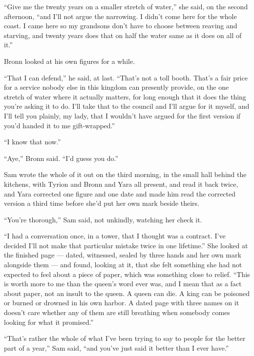“Give me the twenty years on a smaller stretch of water,” she said, on the second afternoon, “and I’ll not argue the narrowing. I didn’t come here for the whole coast. I came here so my grandsons don’t have to choose between reaving and starving, and twenty years does that on half the water same as it does on all of it.”

Bronn looked at his own figures for a while.

“That I can defend,” he said, at last. “That’s not a toll booth. That’s a fair price for a service nobody else in this kingdom can presently provide, on the one stretch of water where it actually matters, for long enough that it does the thing you’re asking it to do. I’ll take that to the council and I’ll argue for it myself, and I’ll tell you plainly, my lady, that I wouldn’t have argued for the first version if you’d handed it to me gift-wrapped.”

“I know that now.”

“Aye,” Bronn said. “I’d guess you do.”

\sceneBreak

Sam wrote the whole of it out on the third morning, in the small hall behind the kitchens, with Tyrion and Bronn and Yara all present, and read it back twice, and Yara corrected one figure and one date and made him read the corrected version a third time before she’d put her own mark beside theirs.

“You’re thorough,” Sam said, not unkindly, watching her check it.

“I had a conversation once, in a tower, that I thought was a contract. I’ve decided I’ll not make that particular mistake twice in one lifetime.” She looked at the finished page — dated, witnessed, sealed by three hands and her own mark alongside them — and found, looking at it, that she felt something she had not expected to feel about a piece of paper, which was something close to relief. “This is worth more to me than the queen’s word ever was, and I mean that as a fact about paper, not an insult to the queen. A queen can die. A king can be poisoned or burned or drowned in his own harbor. A dated page with three names on it doesn’t care whether any of them are still breathing when somebody comes looking for what it promised.”

“That’s rather the whole of what I’ve been trying to say to people for the better part of a year,” Sam said, “and you’ve just said it better than I ever have.”

\sceneBreak

